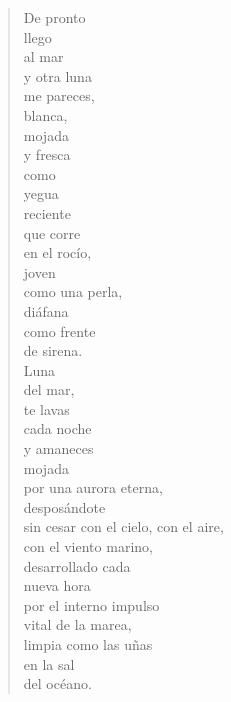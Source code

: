 \documentclass[12pt]{article}
\begin{document}
\begin{verse}
De pronto\\
llego\\
al mar\\
y otra luna\\
me pareces,\\
blanca,\\
mojada\\
y fresca\\
como\\
yegua\\
reciente\\
que corre\\
en el rocío,\\
joven\\
como una perla,\\
diáfana\\
como frente\\
de sirena.\\
Luna\\
del mar,\\
te lavas\\
cada noche\\
y amaneces\\
mojada\\
por una aurora eterna,\\
desposándote\\
sin cesar con el cielo, con el aire,\\
con el viento marino,\\
desarrollado cada\\
nueva hora\\
por el interno impulso\\
vital de la marea,\\
limpia como las uñas\\
en la sal\\
del océano.  


\end{verse}
\end{document}
